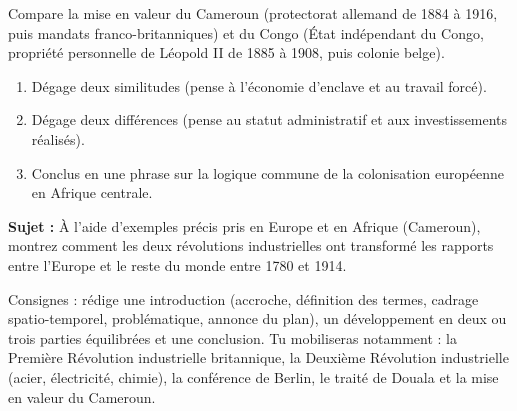 \documentclass[11pt]{article}
\newcounter{popsec}
\newcounter{popsub}
\newcommand{\courssub}[1]{%
  \stepcounter{popsub}%
  \par\vspace{9pt}\noindent{\popxbold\fontsize{11.5}{13}\selectfont\color{popink}{\color{poporange}\thepopsec.\thepopsub}\hspace{6pt}#1}\par\nopagebreak\vspace{4pt}
}
\begin{document}
\begin{exercice}
Compare la mise en valeur du Cameroun (protectorat allemand de 1884 à 1916, puis mandats franco-britanniques) et du Congo (État indépendant du Congo, propriété personnelle de Léopold II de 1885 à 1908, puis colonie belge).
\begin{enumerate}
\item Dégage deux similitudes (pense à l'économie d'enclave et au travail forcé).
\item Dégage deux différences (pense au statut administratif et aux investissements réalisés).
\item Conclus en une phrase sur la logique commune de la colonisation européenne en Afrique centrale.
\end{enumerate}
\end{exercice}

\courssub{Je me prépare au Bac}

\begin{exercice}
\textbf{Sujet :} À l'aide d'exemples précis pris en Europe et en Afrique (Cameroun), montrez comment les deux révolutions industrielles ont transformé les rapports entre l'Europe et le reste du monde entre 1780 et 1914.
\par\medskip
Consignes : rédige une introduction (accroche, définition des termes, cadrage spatio-temporel, problématique, annonce du plan), un développement en deux ou trois parties équilibrées et une conclusion. Tu mobiliseras notamment : la Première Révolution industrielle britannique, la Deuxième Révolution industrielle (acier, électricité, chimie), la conférence de Berlin, le traité de Douala et la mise en valeur du Cameroun.
\end{exercice}
\end{document}

